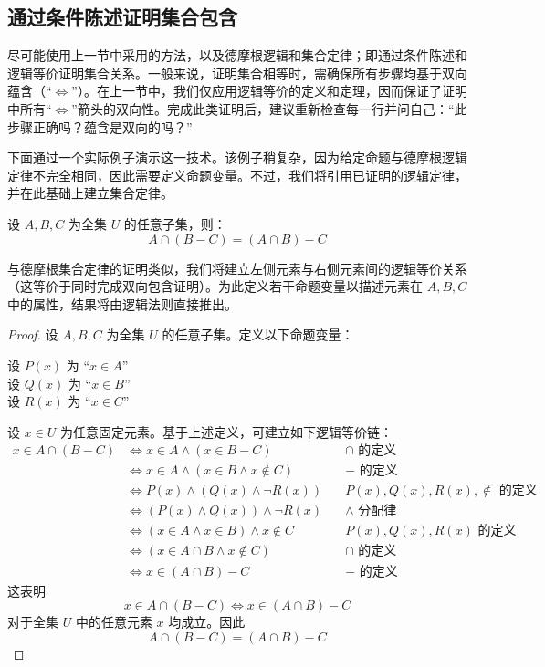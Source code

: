 \subsection{通过条件陈述证明集合包含}

尽可能使用上一节中采用的方法，以及德摩根逻辑和集合定律；即通过条件陈述和逻辑等价证明集合关系。一般来说，证明集合相等时，需确保所有步骤均基于双向蕴含（``$\iff$''）。在上一节中，我们仅应用逻辑等价的定义和定理，因而保证了证明中所有``$\iff$''箭头的双向性。完成此类证明后，建议重新检查每一行并问自己：``此步骤正确吗？蕴含是双向的吗？''

下面通过一个实际例子演示这一技术。该例子稍复杂，因为给定命题与德摩根逻辑定律不完全相同，因此需要定义命题变量。不过，我们将引用已证明的逻辑定律，并在此基础上建立集合定律。

\begin{proposition}
    设 $A, B, C$ 为全集 $U$ 的任意子集，则：
    \[A \cap (B - C) = (A \cap B) - C\]
\end{proposition}

与德摩根集合定律的证明类似，我们将建立左侧元素与右侧元素间的逻辑等价关系（这等价于同时完成双向包含证明）。为此定义若干命题变量以描述元素在 $A, B, C$ 中的属性，结果将由逻辑法则直接推出。

\begin{proof}
    设 $A, B, C$ 为全集 $U$ 的任意子集。定义以下命题变量：
    \begin{center}
        设 $P(x)$ 为 ``$x \in A$'' \\
        设 $Q(x)$ 为 ``$x \in B$'' \\
        设 $R(x)$ 为 ``$x \in C$'' 
    \end{center}
    设 $x \in U$ 为任意固定元素。基于上述定义，可建立如下逻辑等价链：
    \begin{align*}
        x \in A \cap (B - C) &\iff x \in A \land (x \in B - C) &\quad \cap \text{\ 的定义} \\
        &\iff x \in A \land (x \in B \land x \notin C) &\quad - \text{\ 的定义}\\
        &\iff P(x) \land (Q(x) \land \neg R(x)) &\quad P(x), Q(x), R(x), \notin \text{\ 的定义} \\
        &\iff (P(x) \land Q(x)) \land \neg R(x) &\quad \land \text{\ 分配律} \\
        &\iff (x \in A \land x \in B) \land x \notin C &\quad P(x), Q(x), R(x) \text{\ 的定义}\\
        &\iff (x \in A \cap B \land x \notin C) &\quad \cap \text{\ 的定义} \\
        &\iff x \in (A \cap B) - C &\quad - \text{\ 的定义}
    \end{align*}
    这表明
    \[x \in A \cap (B - C) \iff x \in (A \cap B) - C\]
    对于全集 $U$ 中的任意元素 $x$ 均成立。因此
    \[A \cap (B - C) = (A \cap B) - C\]
\end{proof}

